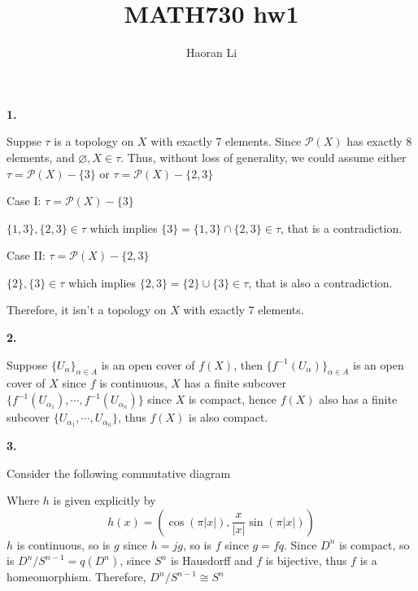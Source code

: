 \documentclass{article}
\title{MATH730 hw1}
\author{Haoran Li}
\date{}
\begin{document}
\maketitle

\noindent
\textbf{1.} \par\noindent
Suppse $\tau$ is a topology on $X$ with exactly 7 elements. Since $\mathscr{P}(X)$ has exactly 8 elements, and $\varnothing,X \in\tau$. Thus, without loss of generality, we could assume either $\tau = \mathscr{P}(X)-\{3\}$ or $\tau = \mathscr{P}(X)-\{2,3\}$ \par\noindent
Case I: $\tau = \mathscr{P}(X)-\{3\}$ \par\noindent
$ \{1,3\},\{2,3\}\in\tau $ which implies $ \{3\} = \{1,3\}\cap \{2,3\} \in \tau $, that is a contradiction. \par\noindent
Case II: $\tau = \mathscr{P}(X)-\{2,3\}$ \par\noindent
$ \{2\},\{3\}\in\tau $ which implies $ \{2,3\} = \{2\}\cup \{3\} \in \tau $, that is also a contradiction. \par\noindent
Therefore, it isn't a topology on $X$ with exactly 7 elements. \par\par\noindent
\textbf{2.} \par\noindent
Suppose $\{U_{\alpha}\}_{\alpha\in A}$ is an open cover of $f(X)$, then $\{f^{-1}(U_{\alpha})\}_{\alpha\in A}$ is an open cover of $X$ since $f$ is continuous, $X$ has a finite subcover $\{f^{-1}(U_{\alpha_{1}}),\cdots,f^{-1}(U_{\alpha_{n}})\}$ since $X$ is compact, hence $f(X)$ also has a finite subcover $\{U_{\alpha_{1}},\cdots,U_{\alpha_{n}}\}$, thus $f(X)$ is also compact. \par\par\noindent
\textbf{3.} \par\noindent
Consider the following commutative diagram
\begin{center}
\end{center}
\par\noindent
Where $h$ is given explicitly by
$$ h(x) = \left(\cos{\left(\pi|x|\right)},\dfrac{x}{|x|}\sin{\left(\pi|x|\right)}\right) $$
$h$ is continuous, so is $g$ since $h=jg$, so is $f$ since $g=fq$.
Since $D^{n}$ is compact, so is $D^{n}/S^{n-1}=q(D^{n})$, since $S^{n}$ is Hausdorff and $f$ is bijective, thus $f$ is a homeomorphism. Therefore, $D^{n}/S^{n-1}\cong S^{n}$ \par\par\noindent
\end{document}
